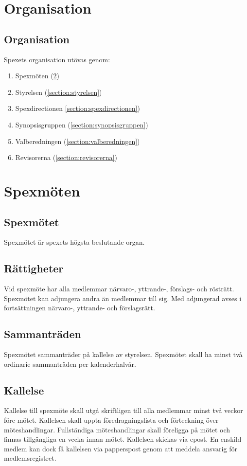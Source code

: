 \documentclass[a4paper]{article}
\begin{document}
\section{Organisation}
\subsection{Organisation}
Spexets organisation utövas genom:

\begin{enumerate}
  \item Spexmöten (\ref{section:spexmöten})
  \item Styrelsen (\ref{section:styrelsen})
  \item Spexdirectionen \ref{section:spexdirectionen})
  \item Synopsisgruppen (\ref{section:synopsisgruppen})
  \item Valberedningen (\ref{section:valberedningen})
  \item Revisorerna (\ref{section:revisorerna})
\end{enumerate}

\section{Spexmöten}
\label{section:spexmöten}

\subsection{Spexmötet}
Spexmötet är spexets högsta beslutande organ.

\subsection{Rättigheter}
Vid spexmöte har alla medlemmar närvaro-, yttrande-, förslags- och rösträtt. Spexmötet kan adjungera andra än medlemmar till sig. Med adjungerad avses i fortsättningen närvaro-, yttrande- och förslagsrätt.

\subsection{Sammanträden}
Spexmötet sammanträder på kallelse av styrelsen. Spexmötet skall ha minst två ordinarie sammanträden per kalenderhalvår.

\subsection{Kallelse}
Kallelse till spexmöte skall utgå skriftligen till alla medlemmar minst två veckor före mötet. Kallelsen skall uppta föredragningslista och förteckning över möteshandlingar. Fullständiga möteshandlingar skall föreligga på mötet och finnas tillgängliga en vecka innan mötet.\newline
\newline
Kallelsen skickas via epost. En enskild medlem kan dock få kallelsen via papperspost genom att meddela ansvarig för medlemsregistret.
\end{document}
